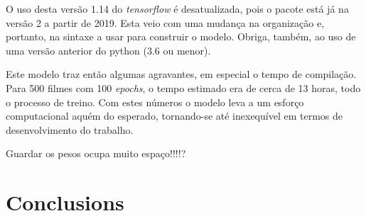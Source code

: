 \documentclass{article}
\begin{document}
O uso desta versão 1.14 do \textit{tensorflow} é desatualizada, pois o pacote está já na versão 2 a partir de 2019. Esta veio com uma mudança na organização e, portanto, na sintaxe a usar para construir o modelo. Obriga, também, ao uso de uma versão anterior do python (3.6 ou menor). 

Este modelo traz então algumas agravantes, em especial o tempo de compilação. Para 500 filmes com 100 \textit{epochs}, o tempo estimado era de cerca de 13 horas, todo o processo de treino. Com estes números o modelo leva a um esforço computacional aquém do esperado, tornando-se até inexequível em termos de desenvolvimento do trabalho.

Guardar os pesos ocupa muito espaço!!!!?


\section{Conclusions}




\end{document}
